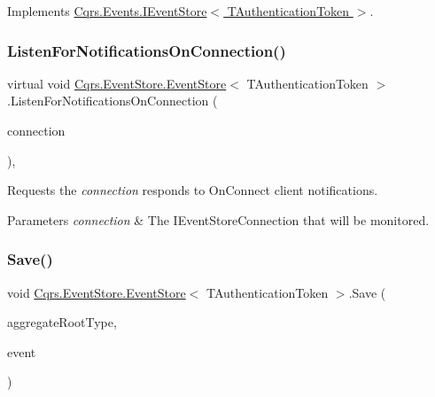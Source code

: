 Implements \hyperlink{interfaceCqrs_1_1Events_1_1IEventStore_af29401f4562cb504cf827b90b8391765_af29401f4562cb504cf827b90b8391765}{Cqrs.\+Events.\+I\+Event\+Store$<$ T\+Authentication\+Token $>$}.

\mbox{\label{classCqrs_1_1EventStore_1_1EventStore_add7396a800fe8f64c61406311e8fee1d_add7396a800fe8f64c61406311e8fee1d}} 
\subsubsection{\texorpdfstring{Listen\+For\+Notifications\+On\+Connection()}{ListenForNotificationsOnConnection()}}
{\footnotesize\ttfamily virtual void \hyperlink{classCqrs_1_1EventStore_1_1EventStore}{Cqrs.\+Event\+Store.\+Event\+Store}$<$ T\+Authentication\+Token $>$.Listen\+For\+Notifications\+On\+Connection (\begin{DoxyParamCaption}\item[{I\+Event\+Store\+Connection}]{connection }\end{DoxyParamCaption})\hspace{0.3cm}{\ttfamily [protected]}, {\ttfamily [virtual]}}



Requests the {\itshape connection}  responds to On\+Connect client notifications. 


\begin{DoxyParams}{Parameters}
{\em connection} & The I\+Event\+Store\+Connection that will be monitored.\\
\hline
\end{DoxyParams}
\mbox{\label{classCqrs_1_1EventStore_1_1EventStore_adce33037e2a3eb81cfccded42ba2ed35_adce33037e2a3eb81cfccded42ba2ed35}} 
\subsubsection{\texorpdfstring{Save()}{Save()}}
{\footnotesize\ttfamily void \hyperlink{classCqrs_1_1EventStore_1_1EventStore}{Cqrs.\+Event\+Store.\+Event\+Store}$<$ T\+Authentication\+Token $>$.Save (\begin{DoxyParamCaption}\item[{Type}]{aggregate\+Root\+Type,  }\item[{\hyperlink{interfaceCqrs_1_1Events_1_1IEvent}{I\+Event}$<$ T\+Authentication\+Token $>$ @}]{event }\end{DoxyParamCaption})}




